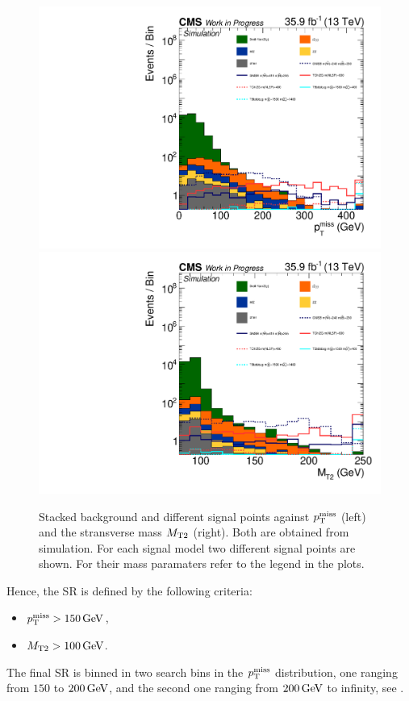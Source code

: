\begin{figure}[tbp]
 \centering
 \includegraphics[width=\pairwidth]{figures/mt2/onZ_LL_met_log}
 \includegraphics[width=\pairwidth]{figures/mt2/onZ_LL_mt2_log}
 \caption{Stacked background and different signal points against $p_{\mathrm{T}}^\text{miss}$ (left) and the stransverse mass $M_{\mathrm{T2}}$ (right). Both are obtained from simulation. For each signal model two different signal points are shown. For their mass paramaters refer to the legend in the plots.}
 \label{fig:SRvariables}
\end{figure}
Hence, the SR is defined by the following criteria:
\begin{itemize}
 \item $p_{\mathrm{T}}^\text{miss}>150\,\text{Ge\hspace{-.08em}V}$,
 \item $M_{\mathrm{T2}}>100\,\text{Ge\hspace{-.08em}V}$.
\end{itemize}
The final SR is binned in two search bins in the $p_{\mathrm{T}}^\text{miss}$ distribution, one ranging from $150$ to $200\,\text{Ge\hspace{-.08em}V}$, and the second one ranging from $200\,\text{Ge\hspace{-.08em}V}$ to infinity, see .


